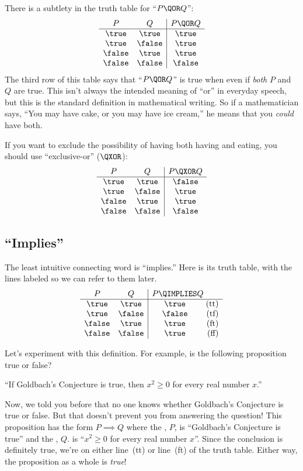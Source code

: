 There is a subtlety in the truth table for ``$P \QOR Q$'':
%
\[
\begin{array}{cc|c}
P & Q & P \QOR Q \\ \hline
\true & \true & \true \\
\true & \false & \true \\
\false & \true & \true \\
\false & \false & \false
\end{array}
\]
%
The third row of this table says that ``$P \QOR Q$'' is true when even if
\textit{both} $P$ and $Q$ are true.  This isn't always the intended
meaning of ``or'' in everyday speech, but this is the standard definition
in mathematical writing.  So if a mathematician says, ``You may have cake,
or you may have ice cream,'' he means that you \textit{could} have both.

If you want to exclude the possibility of having both having and eating, you should use
``exclusive-or'' ($\QXOR$):
%
\[\begin{array}{cc|c}
P & Q & P \QXOR Q \\ \hline
\true & \true & \false \\
\true & \false & \true \\
\false & \true & \true \\
\false & \false & \false
\end{array}
\]
%

\subsection{``Implies''}

The least intuitive connecting word is ``implies.''  Here is its truth
table, with the lines labeled so we can refer to them later.
%
\[
\begin{array}{cc|cr}
    P  &   Q    & \parbox[b]{13ex}{$P \QIMPLIES Q$} \\ \hline
\true  & \true  & \true & \text{(tt)}\\
\true  & \false & \false  & \text{(tf)}\\
\false & \true  & \true  & \text{(ft)}\\
\false & \false & \true  & \text{(ff)}
\end{array}
\]

Let's experiment with this definition.  For example, is the following
proposition true or false?
%
\begin{center}
``If Goldbach's Conjecture is true, then $x^2 \geq 0$ for every real
number $x$.''
\end{center}
%
Now, we told you before that no one knows whether Goldbach's Conjecture is
true or false.  But that doesn't prevent you from answering the question!
This proposition has the form $P \implies Q$ where the ,
$P$, is ``Goldbach's Conjecture is true'' and the , $Q$.
is ``$x^2 \geq 0$ for every real number $x$''.  Since the conclusion is
definitely true, we're on either line~(tt) or line~(ft) of the truth
table.  Either way, the proposition as a whole is \textit{true}!

